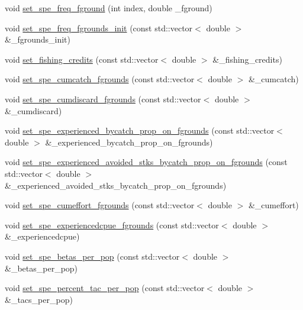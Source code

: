 \begin{DoxyCompactItemize}
\item 
void \mbox{\hyperlink{class_vessel_a7ca74bd3e4f3ad4085a80ba17b9a635e}{set\+\_\+spe\+\_\+freq\+\_\+fground}} (int index, double \+\_\+fground)
\item 
void \mbox{\hyperlink{class_vessel_a555f496c04c9ff9fcfa56cd6b1ebf882}{set\+\_\+spe\+\_\+freq\+\_\+fgrounds\+\_\+init}} (const std\+::vector$<$ double $>$ \&\+\_\+fgrounds\+\_\+init)
\item 
void \mbox{\hyperlink{class_vessel_ad5e2ac561d3d800fb01176d70535ff93}{set\+\_\+fishing\+\_\+credits}} (const std\+::vector$<$ double $>$ \&\+\_\+fishing\+\_\+credits)
\item 
void \mbox{\hyperlink{class_vessel_a9c92e3fce1cb08b5d3a0864c5edaa4f6}{set\+\_\+spe\+\_\+cumcatch\+\_\+fgrounds}} (const std\+::vector$<$ double $>$ \&\+\_\+cumcatch)
\item 
void \mbox{\hyperlink{class_vessel_a5cf4fcf7a7fdd53e71b4915ef41c5e48}{set\+\_\+spe\+\_\+cumdiscard\+\_\+fgrounds}} (const std\+::vector$<$ double $>$ \&\+\_\+cumdiscard)
\item 
void \mbox{\hyperlink{class_vessel_a608b5ab42e43d340f4bb623b05fabcb4}{set\+\_\+spe\+\_\+experienced\+\_\+bycatch\+\_\+prop\+\_\+on\+\_\+fgrounds}} (const std\+::vector$<$ double $>$ \&\+\_\+experienced\+\_\+bycatch\+\_\+prop\+\_\+on\+\_\+fgrounds)
\item 
void \mbox{\hyperlink{class_vessel_acca1c6d05717bee9174e00000964e15b}{set\+\_\+spe\+\_\+experienced\+\_\+avoided\+\_\+stks\+\_\+bycatch\+\_\+prop\+\_\+on\+\_\+fgrounds}} (const std\+::vector$<$ double $>$ \&\+\_\+experienced\+\_\+avoided\+\_\+stks\+\_\+bycatch\+\_\+prop\+\_\+on\+\_\+fgrounds)
\item 
void \mbox{\hyperlink{class_vessel_a9f08e3a540be7a3da0a600e6c4b3adcd}{set\+\_\+spe\+\_\+cumeffort\+\_\+fgrounds}} (const std\+::vector$<$ double $>$ \&\+\_\+cumeffort)
\item 
void \mbox{\hyperlink{class_vessel_a9f42b4af7ede54e329a16c19b344bad5}{set\+\_\+spe\+\_\+experiencedcpue\+\_\+fgrounds}} (const std\+::vector$<$ double $>$ \&\+\_\+experiencedcpue)
\item 
void \mbox{\hyperlink{class_vessel_a8380add692e6a83c57befa7030cf9462}{set\+\_\+spe\+\_\+betas\+\_\+per\+\_\+pop}} (const std\+::vector$<$ double $>$ \&\+\_\+betas\+\_\+per\+\_\+pop)
\item 
void \mbox{\hyperlink{class_vessel_a57058770aaef0db7180b6f90e9eddeed}{set\+\_\+spe\+\_\+percent\+\_\+tac\+\_\+per\+\_\+pop}} (const std\+::vector$<$ double $>$ \&\+\_\+tacs\+\_\+per\+\_\+pop)

\end{DoxyCompactItemize}
